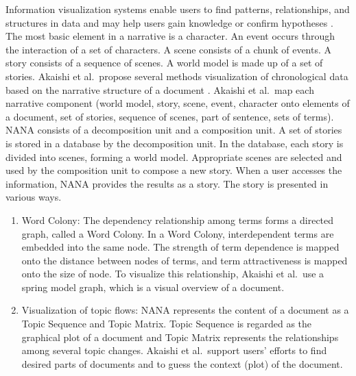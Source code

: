 \documentclass{egpubl}
\begin{document}
Information visualization systems enable users to find patterns, relationships, and structures in data and may help
users gain knowledge or confirm hypotheses \cite{akaishi2007narrative}.  The most basic element in a narrative is a character.
An event occurs through the interaction of a set of characters. A scene consists of a chunk of events. A story consists of a sequence of scenes. A world model is made up of a set of stories.
Akaishi et al.\ propose several methods visualization of chronological data based on the narrative structure of a document \cite{akaishi2007narrative}.
 Akaishi et al.\ map each narrative component (world model, story, scene, event, character onto elements of a document, set of stories, sequence of scenes, part of sentence, sets of terms). NANA consists of a decomposition unit and a composition unit. A set of stories is stored in a database by the decomposition unit. In the database, each story is divided into scenes, forming a world model. Appropriate scenes are selected and used by the composition unit to compose a new story. When a user accesses the information, NANA provides the results as a story. The story is presented in various ways. 
\begin{enumerate}
\item Word Colony: The dependency relationship among terms forms a directed graph, called a Word Colony. In a Word Colony, interdependent terms are embedded into the same node. The strength of term dependence is mapped onto the distance between nodes of terms, and term attractiveness is mapped onto the size of node. To visualize this relationship, Akaishi et al.\ use a spring model graph, which is a visual overview of a document.
\item Visualization of topic flows: NANA represents the content of a document as a Topic Sequence and Topic Matrix. Topic Sequence is regarded as
the graphical plot of a document and Topic Matrix represents the relationships among several topic changes. Akaishi et al.\ support users' efforts to find desired parts of documents and to guess the context (plot) of the document.
\end{enumerate}
\end{document}
